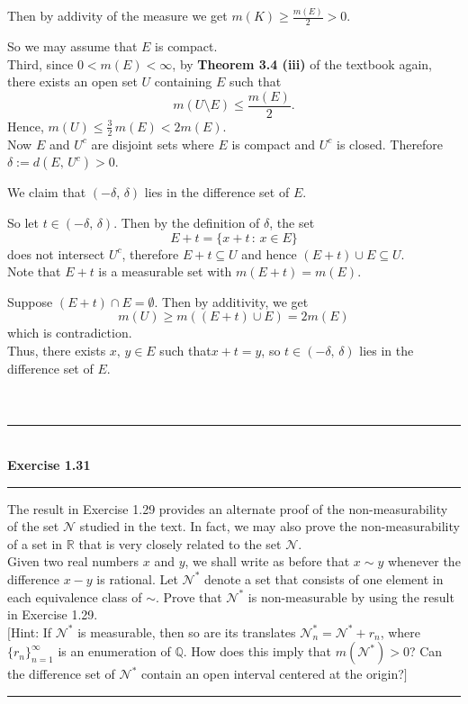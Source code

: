 \documentclass[a4paper,11pt]{article}
\begin{document}
Then by addivity of the measure we get $m(K) \geq \frac{m(E)}{2} > 0$.

So we may assume that $E$ is compact.\\

Third, since $0 < m(E) < \infty$, by \textbf{Theorem 3.4 (iii)} of the textbook again, there exists an open set $U$ containing $E$ such that
	$$m(U \setminus E) \leq \frac{m(E)}{2}.$$
Hence, $m(U) \leq \frac{3}{2}\,m(E) < 2m(E)$.\\

Now $E$ and $U^c$ are disjoint sets where $E$ is compact and $U^c$ is closed. Therefore $\delta := d(E,\,U^c) > 0$.

We claim that $(-\delta,\,\delta)$ lies in the difference set of $E$.

So let $t \in (-\delta,\,\delta)$. Then by the definition of $\delta$, the set
	$$E + t = \{x + t\,:\,x \in E\}$$
does not intersect $U^c$, therefore $E + t \subseteq U$ and hence $(E + t) \cup E \subseteq U$.\\

Note that $E + t$ is a measurable set with $m(E + t) = m(E)$.

Suppose $(E + t) \cap E = \emptyset$. Then by additivity, we get
	$$m(U) \geq m((E + t) \cup E) = 2m(E)$$
which is contradiction.\\

Thus, there exists $x,\,y \in E$ such that$ x + t = y$, so $t \in (-\delta,\,\delta)$ lies in the difference set of $E$.\\\\\\




\begin{flushleft}
	\rule[-0.5ex]{17cm}{2pt}\\
		\textbf{Exercise 1.31}\\
	\rule[1.5ex]{17cm}{0.5pt}
		The result in Exercise 1.29 provides an alternate proof of the non-measurability of the set $\mathcal{N}$ studied in the text. In fact, we may also prove the non-measurability of a set in $\mathbb{R}$ that is very closely related to the set $\mathcal{N}$.\\

		Given two real numbers $x$ and $y$, we shall write as before that $x \sim y$ whenever the difference $x-y$ is rational. Let $\mathcal{N}^*$ denote a set that consists of one element in each equivalence class of $\sim$. Prove that $\mathcal{N}^*$ is non-measurable by using the result in Exercise 1.29.\\

		$[$Hint: If $\mathcal{N}^*$ is measurable, then so are its translates $\mathcal{N}^*_n = \mathcal{N}^* + r_n$, where $\{r_n\}_{n = 1}^\infty$ is an enumeration of $\mathbb{Q}$. How does this imply that $m(\mathcal{N}^*) > 0$? Can the difference set of $\mathcal{N}^*$ contain an open interval centered at the origin?$]$
	\rule[1.0ex]{17cm}{0.5pt}\
\end{flushleft}
\end{document}
